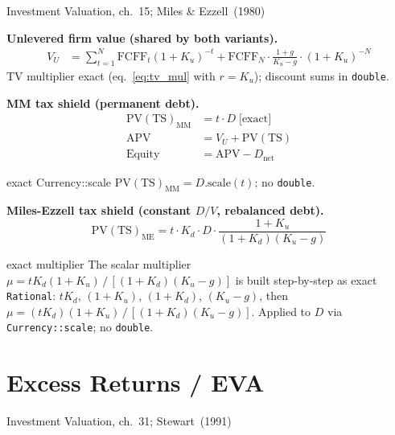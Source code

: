 \documentclass[11pt, a4paper, oneside]{article}
\newcommand{\FCFF}{\mathrm{FCFF}}
\newcommand{\APV}{\mathrm{APV}}
\newcommand{\Kd}{K_d}
\newcommand{\Ku}{K_u}
\newcommand{\exact}{\;\text{[exact]}}
\begin{document}
\begin{damodaran}{Investment Valuation, ch.~15; Miles \& Ezzell~(1980)}
\end{damodaran}

\textbf{Unlevered firm value (shared by both variants).}
\begin{align}
  V_U &= \sum_{t=1}^{N} \FCFF_t (1+\Ku)^{-t}
         + \FCFF_N \cdot \frac{1+g}{\Ku-g} \cdot (1+\Ku)^{-N}
  \label{eq:vu}
\end{align}
TV multiplier exact (eq.~\ref{eq:tv_mul} with $r=\Ku$); discount sums in
\texttt{double}.

\textbf{MM tax shield (permanent debt).}
\begin{align}
  \mathrm{PV(TS)}_\text{MM} &= t \cdot D \exact
  \label{eq:pvts_mm}\\
  \APV &= V_U + \mathrm{PV(TS)} \label{eq:apv}\\
  \text{Equity} &= \APV - D_\text{net}
\end{align}

\begin{impl}{exact Currency::scale}
$\mathrm{PV(TS)}_\text{MM} = D.\text{scale}(t)$; no \texttt{double}.
\end{impl}

\textbf{Miles-Ezzell tax shield (constant $D/V$, rebalanced debt).}
\begin{equation}
  \mathrm{PV(TS)}_\text{ME} = t \cdot \Kd \cdot D \cdot
    \frac{1+\Ku}{(1+\Kd)(\Ku - g)}
  \label{eq:pvts_me}
\end{equation}

\begin{impl}{exact multiplier}
The scalar multiplier
$\mu = t\Kd(1+\Ku)\,/\,[(1+\Kd)(\Ku-g)]$
is built step-by-step as exact \texttt{Rational}:
$t\Kd$, $(1+\Ku)$, $(1+\Kd)$, $(\Ku-g)$, then
$\mu = (t\Kd)(1+\Ku)\,/\,[(1+\Kd)(\Ku-g)]$.
Applied to $D$ via \texttt{Currency::scale}; no \texttt{double}.
\end{impl}

\section{Excess Returns / EVA}
\label{sec:eva}

\begin{damodaran}{Investment Valuation, ch.~31; Stewart~(1991)}
\end{damodaran}
\end{document}
